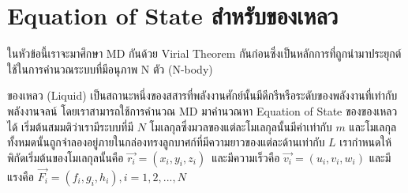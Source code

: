 

\chapter{Equation of State สำหรับของเหลว}
\label{ap:equation_of_state}

ในหัวข้อนี้เราจะมาศึกษา MD กันด้วย Virial Theorem กันก่อนซึ่งเป็นหลักการที่ถูกนำมาประยุกต์ใช้ในการคำนวณระบบที่มีอนุภาพ N ตัว (N-body)

ของเหลว (Liquid) เป็นสถานะหนึ่งของสสารที่พลังงานศักย์นั้นมีดีกรีหรือระดับของพลังงานที่เท่ากับพลังงานจลน์ โดยเราสามารถใช้การคำนวณ MD มาคำนวณหา Equation of State ของของเหลวได้ เริ่มต้นสมมติว่าเรามีระบบที่มี $N$ โมเลกุลซึ่งมวลของแต่ละโมเลกุลนั้นมีค่าเท่ากับ $m$ และโมเลกุลทั้งหมดนั้นถูกจำลองอยู่ภายในกล่องทรงลูกบาศก์ที่มีความยาวของแต่ละด้านเท่ากับ $L$ เรากำหนดให้พิกัดเริ่มต้นของโมเลกุลนั้นคือ $\vec{r_i} = (x_i, y_i, z_i)\,$ และมีความเร็วคือ $\vec{v_i} = (u_i, v_i, w_i)$ และมีแรงคือ $\vec{F_i} = (f_i, g_i, h_i), i = 1, 2, ..., N$

